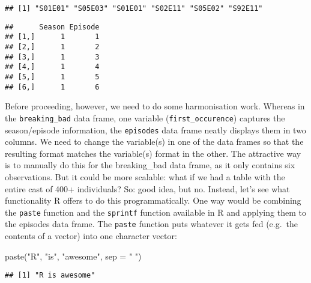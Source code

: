 \documentclass[
]{article}
\newenvironment{Shaded}{\begin{snugshade}}{\end{snugshade}}
\newcommand{\AttributeTok}[1]{\textcolor[rgb]{0.77,0.63,0.00}{#1}}
\newcommand{\FunctionTok}[1]{\textcolor[rgb]{0.00,0.00,0.00}{#1}}
\newcommand{\NormalTok}[1]{#1}
\newcommand{\SpecialCharTok}[1]{\textcolor[rgb]{0.00,0.00,0.00}{#1}}
\newcommand{\StringTok}[1]{\textcolor[rgb]{0.31,0.60,0.02}{#1}}
\begin{document}
\begin{verbatim}
## [1] "S01E01" "S05E03" "S01E01" "S02E11" "S05E02" "S92E11"
\end{verbatim}

\begin{Shaded}
\end{Shaded}

\begin{verbatim}
##      Season Episode
## [1,]      1       1
## [2,]      1       2
## [3,]      1       3
## [4,]      1       4
## [5,]      1       5
## [6,]      1       6
\end{verbatim}

Before proceeding, however, we need to do some harmonisation work.
Whereas in the \texttt{breaking\_bad} data frame, one variable
(\texttt{first\_occurence}) captures the season/episode information, the
\texttt{episodes} data frame neatly displays them in two columns. We
need to change the variable(s) in one of the data frames so that the
resulting format matches the variable(s) format in the other. The
attractive way is to manually do this for the breaking\_bad data frame,
as it only contains six observations. But it could be more scalable:
what if we had a table with the entire cast of 400+ individuals? So:
good idea, but no. Instead, let's see what functionality R offers to do
this programmatically. One way would be combining the \texttt{paste}
function and the \texttt{sprintf} function available in R and applying
them to the episodes data frame. The \texttt{paste} function puts
whatever it gets fed (e.g.~the contents of a vector) into one character
vector:

\begin{Shaded}
\begin{Highlighting}[]
\FunctionTok{paste}\NormalTok{(}\StringTok{"R"}\NormalTok{, }\StringTok{"is"}\NormalTok{, }\StringTok{"awesome"}\NormalTok{, }\AttributeTok{sep =} \StringTok{" "}\NormalTok{)}
\end{Highlighting}
\end{Shaded}

\begin{verbatim}
## [1] "R is awesome"
\end{verbatim}
\end{document}
